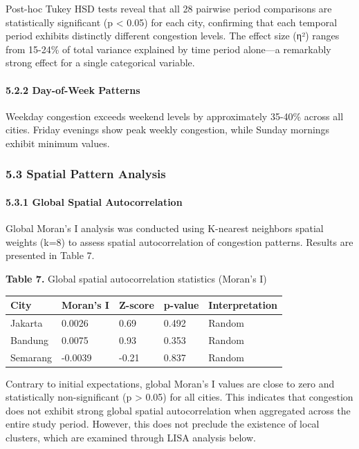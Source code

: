 Post-hoc Tukey HSD tests reveal that all 28 pairwise period comparisons are statistically significant (p \textless{} 0.05) for each city, confirming that each temporal period exhibits distinctly different congestion levels. The effect size (η²) ranges from 15-24\% of total variance explained by time period alone---a remarkably strong effect for a single categorical variable.

\paragraph{5.2.2 Day-of-Week Patterns}\label{day-of-week-patterns}

Weekday congestion exceeds weekend levels by approximately 35-40\% across all cities. Friday evenings show peak weekly congestion, while Sunday mornings exhibit minimum values.

\subsubsection{5.3 Spatial Pattern Analysis}\label{spatial-pattern-analysis}

\paragraph{5.3.1 Global Spatial Autocorrelation}\label{global-spatial-autocorrelation-1}

Global Moran's I analysis was conducted using K-nearest neighbors spatial weights (k=8) to assess spatial autocorrelation of congestion patterns. Results are presented in Table 7.

\textbf{Table 7.} Global spatial autocorrelation statistics (Moran's I)

\begin{longtable}[]{@{}lllll@{}}
\toprule\noalign{}
City & Moran's I & Z-score & p-value & Interpretation \\
\midrule\noalign{}
\endhead
\bottomrule\noalign{}
\endlastfoot
Jakarta & 0.0026 & 0.69 & 0.492 & Random \\
Bandung & 0.0075 & 0.93 & 0.353 & Random \\
Semarang & -0.0039 & -0.21 & 0.837 & Random \\
\end{longtable}

Contrary to initial expectations, global Moran's I values are close to zero and statistically non-significant (p \textgreater{} 0.05) for all cities. This indicates that congestion does not exhibit strong global spatial autocorrelation when aggregated across the entire study period. However, this does not preclude the existence of local clusters, which are examined through LISA analysis below.

